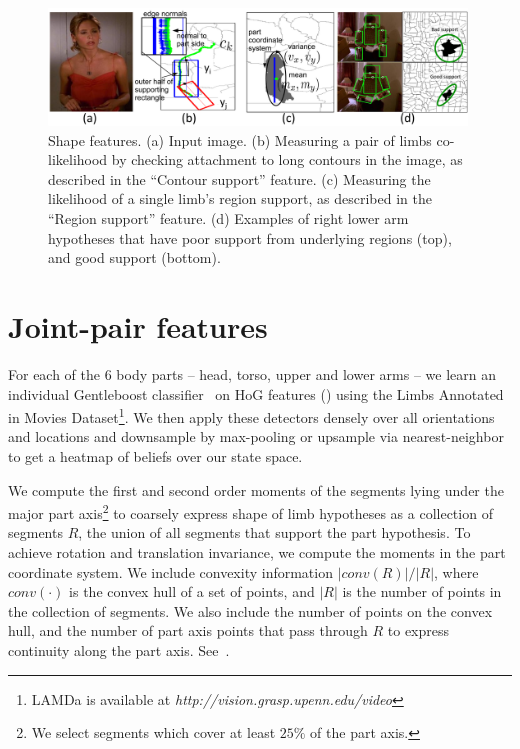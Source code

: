 \begin{figure}[tb]
\begin{center}
\includegraphics[width=0.99\textwidth]{figs/contour-feature.pdf}
\caption[Shape features.]{Shape features.  (a) Input image.  (b) Measuring a 
pair of limbs co-likelihood by checking attachment to long contours in the 
image, as described in the ``Contour support'' feature.  (c)  Measuring the 
likelihood of a single limb's region support, as described in the ``Region 
support'' feature. (d) Examples of right lower arm hypotheses that have poor 
support from underlying regions (top), and good support (bottom).}
\label{fig:contour-feature}
\end{center}
\end{figure}


\section{Joint-pair features}\label{sec:joint-joint}
 For each of the 6 body parts -- head, 
torso, upper and lower arms -- we learn an individual Gentleboost 
classifier~\cite{friedman00} on HoG features () using the Limbs 
Annotated in Movies Dataset\footnote{LAMDa is available at 
\textit{http://vision.grasp.upenn.edu/video}}.  We then apply these detectors 
densely over all orientations and locations and downsample by max-pooling or 
upsample via nearest-neighbor to get a heatmap of beliefs over our state space.

We compute the first and second order moments of the segments lying under the 
major part axis\footnote{We select segments which cover at least $25\%$ of the 
part axis.} to coarsely express shape of limb hypotheses as a collection of 
segments $R$, the union of all segments that support the part hypothesis. To 
achieve rotation and translation invariance, we compute the moments in the part 
coordinate system.  We include convexity information $|conv(R)|/|R|$, where 
$conv(\cdot)$ is the convex hull of a set of points, and $|R|$ is the number of 
points in the collection of segments.  We also include the number of points on 
the convex hull, and the number of part axis points that pass through $R$ to 
express continuity along the part axis.  See~.

